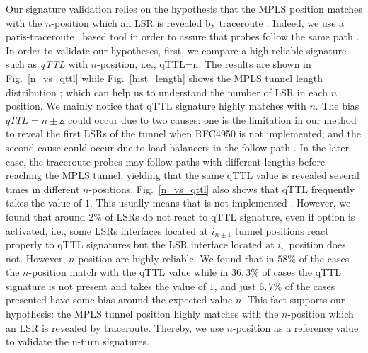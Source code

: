 Our signature validation relies on the hypothesis that the MPLS position matches
with the $n$-position  which an LSR is revealed by traceroute .
Indeed, we use a paris-traceroute~\cite{BRICE06}  based tool in order to assure
that probes follow the same path .
In order to validate our hypotheses, first, we compare a high reliable signature
such as \textit{qTTL} with  $n$-position, i.e., qTTL=n. The results are shown in
Fig.~\ref{n_vs_qttl} while Fig.~\ref{hist_length} shows the MPLS tunnel length
distribution ; which can help us to understand the number of LSR in each $n$
position.
We mainly notice that qTTL signature highly matches with $n$.
The bias $\textit{qTTL}=n \pm \vartriangle $ could occur due to two causes: one
is the limitation in our method to reveal the first LSRs  of the tunnel when RFC4950 is not implemented; and the second cause could
occur due to load balancers in the follow path . In the later
case, the traceroute probes may follow paths with different lengths before
reaching the MPLS tunnel, yielding that the same qTTL value is revealed several
times in different $n$-positions. Fig.~\ref{n_vs_qttl} also shows that qTTL
frequently takes the value of $1$. This usually  means that \tpropagate is not
implemented .
However, we found that around $2\%$ of LSRs do not react to qTTL signature, even if
\tpropagate option is activated, i.e., some LSRs interfaces located at $i_{n\pm
1}$ tunnel positions react properly to qTTL signatures but the LSR interface
located at $i_n$ position does not. However, $n$-position are highly reliable.
We found that in $58\%$ of the cases the $n$-position match with the qTTL value
while in $36,3\%$ of cases the qTTL signature is not present and takes the value
of $1$, and just $6,7\%$ of the cases presented have some bias around the
expected value $n$. This fact supports our hypothesis: the  MPLS tunnel position
highly matches with the $n$-position  which an LSR is revealed by traceroute.
Thereby,  we use $n$-position as a reference value to validate the u-turn
signatures.    

